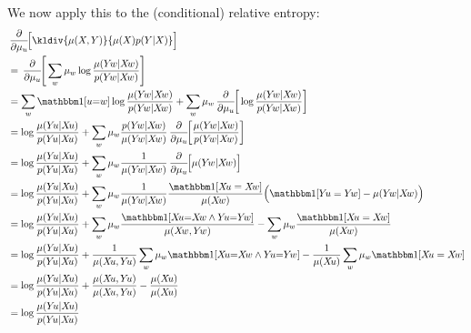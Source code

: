 \begin{lproof}
    We now apply this to the (conditional) relative entropy:
    \begin{align*}
        &\pd/d\mu_u [ \kldiv{\mu(X,Y)}{\mu(X) p(Y|X) }] \\
            &= \pd/d\mu_u [ \sum_{w} \mu_w \log \frac{\mu(Y\! w | X\! w)}{ p(Y\! w | X\! w)} ] \\
            &= \sum_{w} \mathbbm1[u{=}w]  \log \frac{\mu(Y\! w | X\! w)}{  p(Y\! w | X\! w)}
                + \sum_{w} \mu_w  \pd/d\mu_u [  \log \frac{\mu(Y\! w | X\! w)}{  p(Y\! w | X\! w)} ] \\
            &=  \log \frac{\mu(Y\! u | X\! u)}{  p(Y\! u | X\! u)}
                + \sum_{w} \mu_w  
                \frac{  p(Y\! w | X\! w)}{\mu(Y\! w | X\! w)}
                \pd/d\mu_u [ \frac{\mu(Y\! w | X\! w)}{  p(Y\! w | X\! w)} ] \\
            &=  \log \frac{\mu(Y\! u | X\! u)}{  p(Y\! u | X\! u)}
                + \sum_{w} \mu_w  
                \frac{1}{\mu(Y\! w | X\! w)}
                \pd/d\mu_u [\mu(Y\! w | X\! w) ] \\
            &=  \log \frac{\mu(Y\! u | X\! u)}{  p(Y\! u | X\! u)}
                + \sum_{w} \mu_w  
                \frac{1}{\mu(Y\! w | X\! w)}
                 \frac{\mathbbm1[X\!u = X\!w]}{\mu(X\!w)}\Big( \mathbbm1[Y\!u=Y\!w] - \mu(Y\!w|X\!w) \Big)\\
            &=  \log \frac{\mu(Y\! u | X\! u)}{  p(Y\! u | X\! u)}
                + \sum_{w} \mu_w  \frac{\mathbbm1[X\!u{=}X\!w \land Y\!u{=}Y\!w]}
                    {\mu(X\!w, Y\!w)}
                - \sum_{w} \mu_w \frac{\mathbbm1[X\!u = X\!w]}{\mu(X\!w)}
                \\
            &=  \log \frac{\mu(Y\! u | X\! u)}{  p(Y\! u | X\! u)}
                + \frac{1}{\mu(X\!u, Y\!u)} \sum_w \mu_w  \mathbbm1[X\!u{=}X\!w \land Y\!u{=}Y\!w]
                - \frac{1}{\mu(X\!u)} \sum_w \mu_w \mathbbm1[X\!u = X\!w]
                \\
            &=  \log \frac{\mu(Y\! u | X\! u)}{  p(Y\! u | X\! u)}
                + \frac{\mu(X\!u, Y\!u)}{\mu(X\!u, Y\!u)} 
                - \frac{\mu(X\!u)}{\mu(X\!u)}   \\
            &= \log \frac{\mu(Y\! u | X\! u)}{  p(Y\! u | X\! u)}
    \end{align*}
    

\end{lproof}
